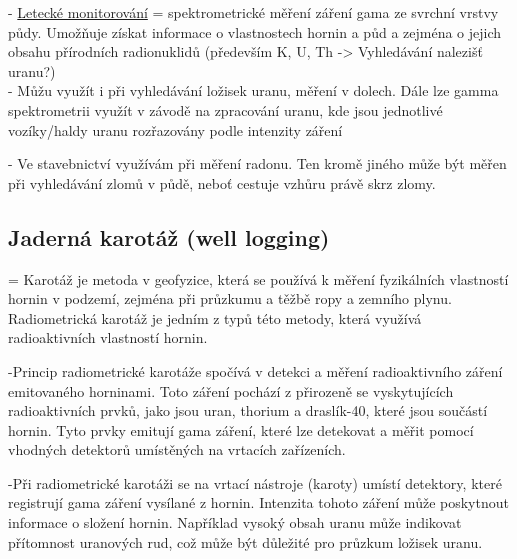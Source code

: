 - \underline{Letecké monitorování} = spektrometrické měření záření gama ze svrchní vrstvy půdy. Umožňuje získat informace o vlastnostech hornin a půd a zejména o jejich obsahu přírodních radionuklidů (především K, U, Th -> Vyhledávání nalezišť uranu?)
\\

- Můžu využít i při vyhledávání ložisek uranu, měření v dolech. Dále lze gamma spektrometrii využít v závodě na zpracování uranu, kde jsou jednotlivé vozíky/haldy uranu rozřazovány podle intenzity záření

- Ve stavebnictví využívám při měření radonu. Ten kromě jiného může být měřen při vyhledávání zlomů v půdě, neboť cestuje vzhůru právě skrz zlomy.
\\

\subsection{Jaderná karotáž (well logging)} = Karotáž je metoda v geofyzice, která se používá k měření fyzikálních vlastností hornin v podzemí, zejména při průzkumu a těžbě ropy a zemního plynu. Radiometrická karotáž je jedním z typů této metody, která využívá radioaktivních vlastností hornin.

-Princip radiometrické karotáže spočívá v detekci a měření radioaktivního záření emitovaného horninami. Toto záření pochází z přirozeně se vyskytujících radioaktivních prvků, jako jsou uran, thorium a draslík-40, které jsou součástí hornin. Tyto prvky emitují gama záření, které lze detekovat a měřit pomocí vhodných detektorů umístěných na vrtacích zařízeních.

-Při radiometrické karotáži se na vrtací nástroje (karoty) umístí detektory, které registrují gama záření vysílané z hornin. Intenzita tohoto záření může poskytnout informace o složení hornin. Například vysoký obsah uranu může indikovat přítomnost uranových rud, což může být důležité pro průzkum ložisek uranu.

